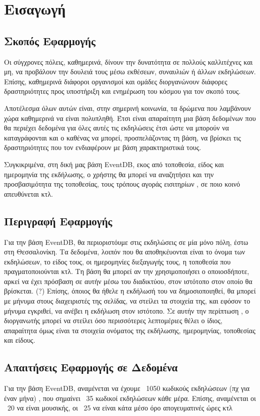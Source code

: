 \section{Εισαγωγή}

\subsection{Σκοπός Εφαρμογής}

\par Οι σύγχρονες πόλεις, καθημερινά, δίνουν την δυνατότητα σε πολλούς καλλιτέχνες και μη,
να προβάλουν την δουλειά τους μέσω εκθέσεων, συναυλιών ή άλλων εκδηλώσεων. Επίσης, καθημερινά διάφοροι οργανισμοί και ομάδες διοργανώνουν διάφορες δραστηριότητες προς υποστήριξη και ενημέρωση του κόσμου για τον σκοπό τους. 
\par Αποτέλεσμα όλων αυτών είναι, στην σημερινή κοινωνία, τα δρώμενα που λαμβάνουν χώρα καθημερινά να είναι πολυπληθή. Έτσι είναι απαραίτητη μια βάση δεδομένων που θα περιέχει δεδομένα για όλες αυτές τις εκδηλώσεις έτσι ώστε να μπορούν να καταγράφονται και ο καθένας να μπορεί, προσπελάζοντας τη βάση, να βρίσκει τις δραστηριότητες που τον ενδιαφέρουν με βάση χαρακτηριστικά τους.
\par Συγκικριμένα, στη δική μας βάση EventDB, εκος από τοποθεσία, είδος και ημερομηνία της εκδήλωσης, ο χρήστης θα μπορεί να αναζητήσει και την προσβασιμότητα της τοποθεσίας, τους τρόπους αγοράς εισιτηρίων , σε ποιο κοινό απευθύνεται κτλ. 

\subsection{Περιγραφή Εφαρμογής}

\par Για την βάση EventDB, θα περιοριστόυμε στις εκδηλώσεις σε μία μόνο πόλη, έστω στη Θεσσαλονίκη. Τα δεδομένα, λοιπόν που θα αποθηκέυονται είναι το όνομα των εκδηλώσεων, το είδος τους,  οι ημερομηνίες διεξαγωγής τους, η τοποθεσία που πραγματοποιούνται κτλ. Τη βάση θα μπορεί αν την χρησιμοποιήσει ο οποιοσδήποτε, αρκεί να έχει πρόσβαση σε αυτήν μέσω του διαδικτύου, στον ιστότοπο στον οποίο θα βρίσκεται. (?) Επίσης, όποιος θα ήθελε η εκδήλωσή του να δημοσιοποιηθεί, θα μπορεί με μήνυμα στους διαχειριστές της σελίδας, να στείλει τα στοιχεία της, και εφόσον το μήνυμα εγκριθεί, να ανέβει η εκδήλωση στον ιστότοπο. Σε αυτήν την περίπτωση , ο διοργανωτής μπορεί να στείλει όσο περισσότερες λεπτομέριες θέλει ο ίδιος, απαραίτητα όμως είναι τα στοιχεία ονόματος της εκδήλωσης, ημερομηνίας, τοποθεσίας και είδους.

\subsection{Απαιτήσεις Εφαρμογής σε Δεδομένα}

\par Για την βάση EventDB, αναμένεται να έχουμε ~1050 κωδικούς εκδηλώσεων (πχ για έναν μήνα) , που σημαίνει ~35 κωδικοί εκδηλώσεων κάθε μέρα. Επίσης, αναμένεται οι ~20 να είναι μουσικής, οι ~25 να είναι κάτα μέσο όρο απογευματινές ώρες κτλ



